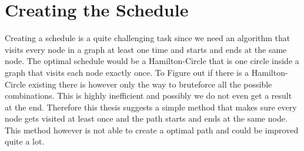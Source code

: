 \section{Creating the Schedule}
Creating a schedule is a quite challenging task since we need an algorithm that visits every node in a graph at least one time and starts and ends at the same node. The optimal schedule would be a Hamilton-Circle that is one circle inside a graph that visits each node exactly once. To Figure out if there is a Hamilton-Circle existing there is however only the way to bruteforce all the possible combinations. This is highly inefficient and possibly we do not even get a result at the end. Therefore this thesis suggests a simple method that makes sure every node gets visited at least once and the path starts and ends at the same node. This method however is not able to create a optimal path and could be improved quite a lot.

